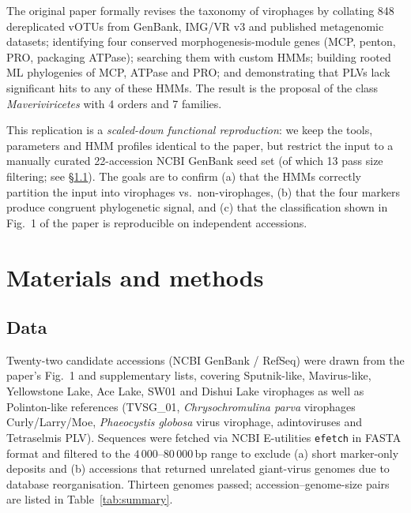 \documentclass[11pt,a4paper]{article}
\begin{document}
The original paper formally revises the taxonomy of virophages by collating
848 dereplicated vOTUs from GenBank, IMG/VR v3 and published metagenomic
datasets; identifying four conserved morphogenesis-module genes (MCP, penton,
PRO, packaging ATPase); searching them with custom HMMs; building rooted ML
phylogenies of MCP, ATPase and PRO; and demonstrating that PLVs lack
significant hits to any of these HMMs. The result is the proposal of the
class \emph{Maveriviricetes} with 4 orders and 7 families.

This replication is a \emph{scaled-down functional reproduction}: we keep the
tools, parameters and HMM profiles identical to the paper, but restrict the
input to a manually curated 22-accession NCBI GenBank seed set (of which 13
pass size filtering; see \S\ref{sec:data}). The goals are to confirm
(a) that the HMMs correctly partition the input into virophages vs.\ non-virophages,
(b) that the four markers produce congruent phylogenetic signal, and
(c) that the classification shown in Fig.~1 of the paper is reproducible on
independent accessions.

\section{Materials and methods}

\subsection{Data}
\label{sec:data}
Twenty-two candidate accessions (NCBI GenBank / RefSeq) were drawn from the
paper's Fig.~1 and supplementary lists, covering Sputnik-like, Mavirus-like,
Yellowstone Lake, Ace Lake, SW01 and Dishui Lake virophages as well as
Polinton-like references (TVSG\_01, \emph{Chrysochromulina parva} virophages
Curly/Larry/Moe, \emph{Phaeocystis globosa} virus virophage, adintoviruses
and Tetraselmis PLV). Sequences were fetched via NCBI E-utilities
\texttt{efetch} in FASTA format and filtered to the
$4\,000$--$80\,000$\,bp range to exclude (a) short marker-only deposits and
(b) accessions that returned unrelated giant-virus genomes due to database
reorganisation. Thirteen genomes passed; accession--genome-size pairs are
listed in Table~\ref{tab:summary}.
\end{document}
